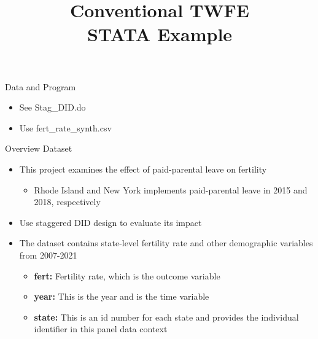 \documentclass[dvipsnames,hyperref={pdfpagelabels=false}]{beamer}
\begin{document}
\title[]  
{Conventional TWFE \\ STATA Example}

\author 
{}

\institute{}


\date
{}

\begin{frame}{}
	\titlepage
\end{frame}





\begin{frame}{Data and Program}{}
	\begin{itemize}
		\item See Stag\_DID.do
		\vspace{0.2cm}
		\item Use fert\_rate\_synth.csv
		
		
	\end{itemize}
\end{frame}





\begin{frame}[fragile]{Overview Dataset}	
	\begin{itemize}
		
		
		\item This project examines the effect of paid-parental leave on fertility
		\begin{itemize}
			\item Rhode Island and New York implements paid-parental leave in 2015 and 2018, respectively
			\vspace{0.2cm}		
		\end{itemize}
		
		\item Use staggered DID design to evaluate its impact		
		\vspace{0.2cm}		
		\item The dataset contains state-level fertility rate and other demographic variables from 2007-2021
		\vspace{0.2cm}
		
		
		\begin{itemize}	
			\vspace{0.2cm}	
			\item \textbf{fert:} Fertility rate, which is the outcome variable
			\vspace{0.2cm}
			\item \textbf{year:} This is the year and is the time variable
			\vspace{0.2cm}
			\item \textbf{state:} This is an id number for each state and provides the individual identifier in this panel data context
		\end{itemize}
		
	\end{itemize}
	
	
	
	
\end{frame}
\end{document}
